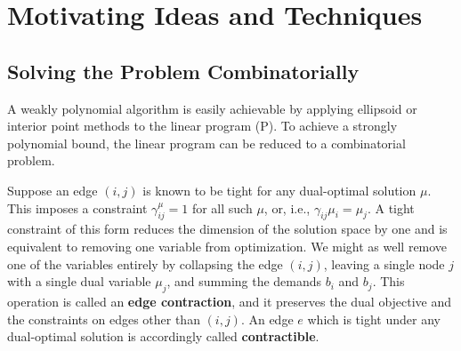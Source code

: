 \documentclass[11pt]{article}
\theoremstyle{definition}
\theoremstyle{definition}
\theoremstyle{definition}
\newcommand{\gij}{\gamma_{ij}}
\newcommand{\giij}{\gamma_{ij}^{\mu}}
\begin{document}
\section{Motivating Ideas and Techniques}
\label{sec:motivate}
	\subsection{Solving the Problem Combinatorially}
	\label{sec:motivate-dual}
	
	A weakly polynomial algorithm is easily achievable by applying ellipsoid or
	interior point methods to the linear program (P). To achieve a strongly polynomial
	bound, the linear program can be reduced to a combinatorial problem.
	
	Suppose an edge $(i, j)$ is known to be tight for any dual-optimal solution $\mu$. This
    imposes a constraint $\giij = 1$ for all such $\mu$, or, i.e., $\gij \mu_i = \mu_j$.
    A tight constraint of this form reduces the dimension of the solution
    space by one and is equivalent to removing one variable from optimization.
    We might as well remove one of the variables entirely by collapsing the edge $(i, j)$,
    leaving a single node $j$ with a single dual variable $\mu_j$, and summing the
    demands $b_i$ and $b_j$. This operation is called an \textbf{edge contraction},
    and it preserves the dual objective and the constraints on edges other than $(i, j)$.
    An edge $e$ which is tight under any dual-optimal solution is accordingly
    called \textbf{contractible}.
    
%
\end{document}
